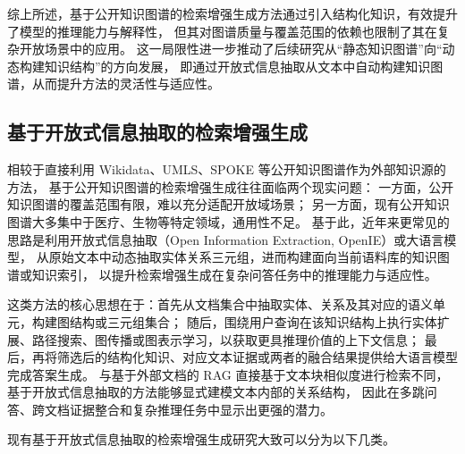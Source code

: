 综上所述，基于公开知识图谱的检索增强生成方法通过引入结构化知识，有效提升了模型的推理能力与解释性，
但其对图谱质量与覆盖范围的依赖也限制了其在复杂开放场景中的应用。
这一局限性进一步推动了后续研究从“静态知识图谱”向“动态构建知识结构”的方向发展，
即通过开放式信息抽取从文本中自动构建知识图谱，从而提升方法的灵活性与适应性。

\subsection{基于开放式信息抽取的检索增强生成}

相较于直接利用 Wikidata、UMLS、SPOKE 等公开知识图谱作为外部知识源的方法，
基于公开知识图谱的检索增强生成往往面临两个现实问题：
一方面，公开知识图谱的覆盖范围有限，难以充分适配开放域场景；
另一方面，现有公开知识图谱大多集中于医疗、生物等特定领域，通用性不足。
基于此，近年来更常见的思路是利用开放式信息抽取（Open Information Extraction, OpenIE）或大语言模型，
从原始文本中动态抽取实体关系三元组，进而构建面向当前语料库的知识图谱或知识索引，
以提升检索增强生成在复杂问答任务中的推理能力与适应性。

这类方法的核心思想在于：首先从文档集合中抽取实体、关系及其对应的语义单元，构建图结构或三元组集合；
随后，围绕用户查询在该知识结构上执行实体扩展、路径搜索、图传播或图表示学习，以获取更具推理价值的上下文信息；
最后，再将筛选后的结构化知识、对应文本证据或两者的融合结果提供给大语言模型完成答案生成。
与基于外部文档的 RAG 直接基于文本块相似度进行检索不同，基于开放式信息抽取的方法能够显式建模文本内部的关系结构，
因此在多跳问答、跨文档证据整合和复杂推理任务中显示出更强的潜力。

现有基于开放式信息抽取的检索增强生成研究大致可以分为以下几类。

